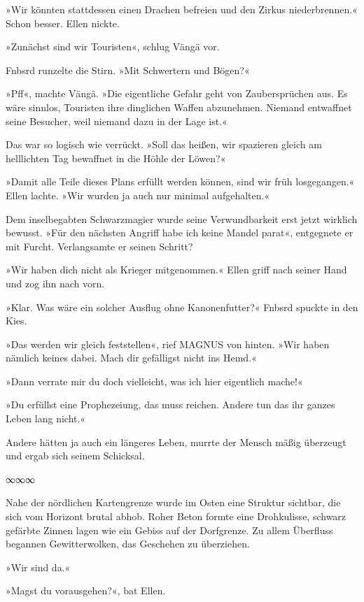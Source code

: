 »Wir könnten stattdessen einen Drachen befreien und den Zirkus niederbrennen.« Schon besser. Ellen nickte.

»Zunächst sind wir Touristen«, schlug Vängä vor.

Fnbsrd runzelte die Stirn. »Mit Schwertern und Bögen?«

»Pff«, machte Vängä. »Die eigentliche Gefahr geht von Zaubersprüchen aus. Es wäre sinnlos, Touristen ihre dinglichen Waffen abzunehmen. Niemand entwaffnet seine Besucher, weil niemand dazu in der Lage ist.«

Das war so logisch wie verrückt. »Soll das heißen, wir spazieren gleich am helllichten Tag bewaffnet in die Höhle der Löwen?«

»Damit alle Teile dieses Plans erfüllt werden können, sind wir früh losgegangen.« Ellen lachte. »Wir wurden ja auch nur minimal aufgehalten.«

Dem inselbegabten Schwarzmagier wurde seine Verwundbarkeit erst jetzt wirklich bewusst. »Für den nächsten Angriff habe ich keine Mandel parat«, entgegnete er mit Furcht. Verlangsamte er seinen Schritt?

»Wir haben dich nicht als Krieger mitgenommen.« Ellen griff nach seiner Hand und zog ihn nach vorn.

»Klar. Was wäre ein solcher Ausflug ohne Kanonenfutter?« Fnbsrd spuckte in den Kies.

»Das werden wir gleich feststellen«, rief MAGNUS von hinten. »Wir haben nämlich keines dabei. Mach dir gefälligst nicht ins Hemd.«

»Dann verrate mir du doch vielleicht, was ich hier eigentlich mache!«

»Du erfüllst eine Prophezeiung, das muss reichen. Andere tun das ihr ganzes Leben lang nicht.«

Andere hätten ja auch ein längeres Leben, murrte der Mensch mäßig überzeugt und ergab sich seinem Schicksal.

\begin{center}
∞∞∞
\end{center}

Nahe der nördlichen Kartengrenze wurde im Osten eine Struktur sichtbar, die sich vom Horizont brutal abhob. Roher Beton formte eine Drohkulisse, schwarz gefärbte Zinnen lagen wie ein Gebiss auf der Dorfgrenze. Zu allem Überfluss begannen Gewitterwolken, das Geschehen zu überziehen.

»Wir sind da.«

»Magst du vorausgehen?«, bat Ellen.

